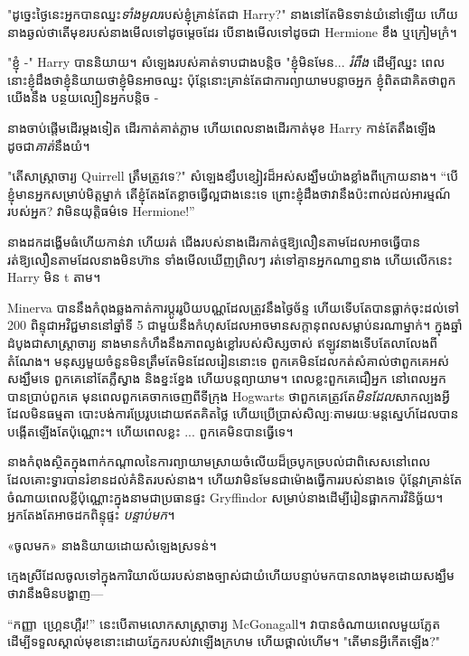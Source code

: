 {{"ដូច្នេះថ្ងៃនេះអ្នកបានឈ្នះ\emph{ទាំងមូល}របស់ខ្ញុំគ្រាន់តែជា Harry?" នាងនៅតែមិនទាន់យំនៅឡើយ ហើយនាងឆ្ងល់ថាតើមុខរបស់នាងមើលទៅដូចម្តេចដែរ បើនាងមើលទៅដូចជា Hermione ខឹង ឬក្រៀមក្រំ។

"ខ្ញុំ -" Harry បាននិយាយ។ សំឡេងរបស់គាត់ទាបជាងបន្តិច "ខ្ញុំមិនមែន... \emph{រំពឹង} ដើម្បីឈ្នះ ពេលនោះខ្ញុំដឹងថាខ្ញុំនិយាយថាខ្ញុំមិនអាចឈ្នះ ប៉ុន្តែនោះគ្រាន់តែជាការព្យាយាមបន្លាចអ្នក ខ្ញុំពិតជាគិតថាពួកយើងនឹង បន្ថយល្បឿនអ្នកបន្តិច -

នាងចាប់ផ្តើមដើរម្តងទៀត ដើរកាត់គាត់ភ្លាម ហើយពេលនាងដើរកាត់មុខ Harry កាន់តែតឹងឡើងដូចជា\emph{គាត់}នឹងយំ។

"តើសាស្រ្តាចារ្យ Quirrell ត្រឹមត្រូវទេ?" សំឡេងខ្សឹបខ្សៀវដ៏អស់សង្ឃឹមយ៉ាងខ្លាំងពីក្រោយនាង។ “បើ​ខ្ញុំ​មាន​អ្នក​សម្រាប់​មិត្ត​ម្នាក់ តើ​ខ្ញុំ​តែងតែ​ខ្លាច​ធ្វើ​ល្អ​ជាង​នេះ​ទេ ព្រោះ​ខ្ញុំ​ដឹង​ថា​វា​នឹង​ប៉ះពាល់​ដល់​អារម្មណ៍​របស់​អ្នក? វាមិនយុត្តិធម៌ទេ Hermione!”

នាងដកដង្ហើមធំហើយកាន់វា ហើយរត់ ជើងរបស់នាងដើរកាត់ថ្មឱ្យលឿនតាមដែលអាចធ្វើបាន រត់ឱ្យលឿនតាមដែលនាងមិនហ៊ាន ទាំងមើលឃើញព្រិលៗ រត់ទៅគ្មានអ្នកណាឮនាង ហើយលើកនេះ Harry មិន t តាម។

\later

Minerva បាននឹងកំពុងឆ្លងកាត់ការប្តូររូបិយបណ្ណដែលត្រូវនឹងថ្ងៃច័ន្ទ ហើយទើបតែបានធ្លាក់ចុះដល់ទៅ 200 ពិន្ទុជាអវិជ្ជមាននៅឆ្នាំទី 5 ជាមួយនឹងកំហុសដែលអាចមានសក្តានុពលសម្លាប់នរណាម្នាក់។ ក្នុង​ឆ្នាំ​ដំបូង​ជា​សាស្ត្រាចារ្យ នាង​មាន​កំហឹង​នឹង​ភាព​ល្ងង់ខ្លៅ​របស់​សិស្ស​ចាស់ ឥឡូវ​នាង​ទើបតែ​លាលែង​ពី​តំណែង។ មនុស្សមួយចំនួនមិនត្រឹមតែមិនដែលរៀននោះទេ ពួកគេមិនដែលកត់សំគាល់ថាពួកគេអស់សង្ឃឹមទេ ពួកគេនៅតែភ្លឺស្វាង និងខ្នះខ្នែង ហើយបន្តព្យាយាម។ ពេលខ្លះពួកគេជឿអ្នក នៅពេលអ្នកបានប្រាប់ពួកគេ មុនពេលពួកគេចាកចេញពីទីក្រុង Hogwarts ថាពួកគេត្រូវតែ\emph{មិនដែល}សាកល្បងអ្វីដែលមិនធម្មតា បោះបង់ការប្រែរូបដោយឥតគិតថ្លៃ ហើយប្រើប្រាស់សិល្បៈតាមរយៈមន្តស្នេហ៍ដែលបានបង្កើតឡើងតែប៉ុណ្ណោះ។ ហើយពេលខ្លះ ... ពួកគេមិនបានធ្វើទេ។

នាងកំពុងស្ថិតក្នុងពាក់កណ្តាលនៃការព្យាយាមស្រាយចំលើយដ៏ច្របូកច្របល់ជាពិសេសនៅពេលដែលគោះទ្វារបានរំខានដល់គំនិតរបស់នាង។ ហើយវាមិនមែនជាម៉ោងធ្វើការរបស់នាងទេ ប៉ុន្តែវាគ្រាន់តែចំណាយពេលខ្លីប៉ុណ្ណោះក្នុងនាមជាប្រធានផ្ទះ Gryffindor សម្រាប់នាងដើម្បីរៀនផ្អាកការវិនិច្ឆ័យ។ អ្នកតែងតែអាចដកពិន្ទុផ្ទះ \emph{បន្ទាប់មក}។

«ចូលមក» នាងនិយាយដោយសំឡេងស្រទន់។

ក្មេង​ស្រី​ដែល​ចូល​ទៅ​ក្នុង​ការិយាល័យ​របស់​នាង​ច្បាស់​ជា​យំ ​​ហើយ​បន្ទាប់​មក​បាន​លាង​មុខ​ដោយ​សង្ឃឹម​ថា​វា​នឹង​មិន​បង្ហាញ—

“កញ្ញា~ហ្គ្រេនហ្គឺរ!” នេះ​បើ​តាម​លោក​សាស្ត្រាចារ្យ McGonagall។ វា​បាន​ចំណាយ​ពេល​មួយ​ភ្លែត​ដើម្បី​ទទួល​ស្គាល់​មុខ​នោះ​ដោយ​ភ្នែក​របស់​វា​ឡើង​ក្រហម ហើយ​ថ្ពាល់​ហើម។ "តើមានអ្វីកើតឡើង?"

}}
